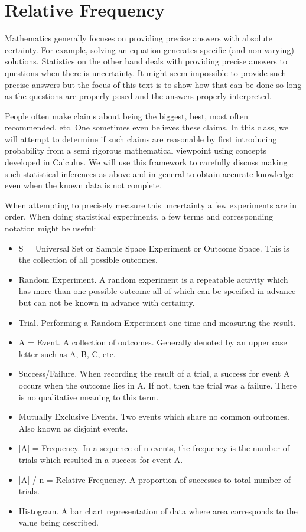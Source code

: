 \documentclass[10pt,]{book}
\theoremstyle{plain}
\theoremstyle{definition}
\theoremstyle{definition}
\numberwithin{equation}{section}
\begin{document}
\section[Relative Frequency]{Relative Frequency}\label{RelativeFrequency}
Mathematics generally focuses on providing precise answers with absolute certainty. For example, solving an equation generates specific (and non-varying) solutions. Statistics on the other hand deals with providing precise answers to questions when there is uncertainty. It might seem impossible to provide such precise answers but the focus of this text is to show how that can be done so long as the questions are properly posed and the answers properly interpreted.%
\par
People often make claims about being the biggest, best, most often recommended, etc. One sometimes even believes these claims. In this class, we will attempt to determine if such claims are reasonable by first introducing probability from a semi rigorous mathematical viewpoint using concepts developed in Calculus. We will use this framework to carefully discuss making such statistical inferences as above and in general to obtain accurate knowledge even when the known data is not complete. %
\par
When attempting to precisely measure this uncertainty a few experiments are in order. When doing statistical experiments, a few terms and corresponding notation might be useful:%
\leavevmode%
\begin{itemize}[label=\textbullet]
\item{}S = Universal Set or Sample Space Experiment or Outcome Space. 
		This is the collection of all possible outcomes.%
\item{}Random Experiment. A random experiment is a repeatable activity which has more than one
		possible outcome all of which can be specified in advance but can not be known in advance with certainty.%
\item{}Trial. Performing a Random Experiment one time and measuring the result.%
\item{}A = Event. A collection of outcomes.  Generally denoted by an upper case letter such as A, B, C, etc.%
\item{}Success/Failure. When recording the result of a trial, a success for event A occurs when the outcome
		lies in A. If not, then the trial was a failure. There is no qualitative meaning to this term.%
\item{}Mutually Exclusive Events. Two events which share no common outcomes. Also known as disjoint events.%
\item{}|A| = Frequency. In a sequence of n events, the frequency is the number of trials which resulted in 
		a success for event A.%
\item{}|A| / n = Relative Frequency. A proportion of successes to total number of trials.%
\item{}Histogram. A bar chart representation of data where area corresponds to the value being described.%
\end{itemize}
\end{document}
